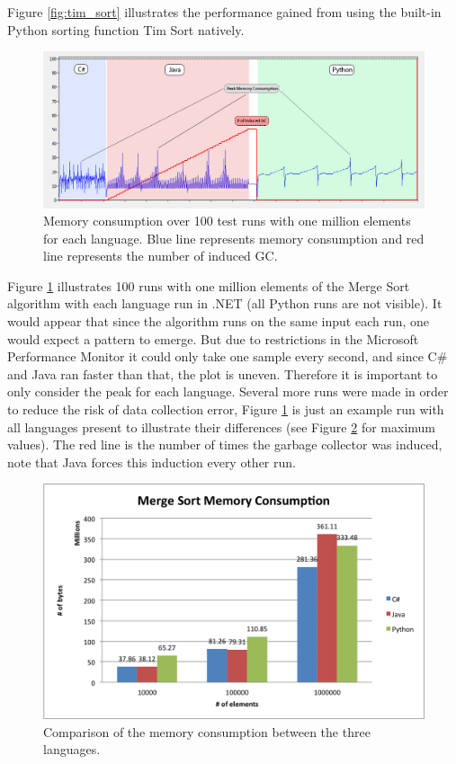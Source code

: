Figure \ref{fig:tim_sort} illustrates the performance gained from using the built-in Python sorting function Tim Sort natively. 



\begin{figure}[h]
	\centering
	\includegraphics[width=1.0\textwidth]{chapters/media/mergesort_memory_1mil_all.png}
	\caption{Memory consumption over 100 test runs with one million elements for each language. Blue line represents memory consumption and red line represents the number of induced GC.}
	\label{fig:merge_sort_memory_all}
\end{figure}


Figure \ref{fig:merge_sort_memory_all} illustrates 100 runs with one million elements of the Merge Sort algorithm with each language run in .NET (all Python runs are not visible). It would appear that since the algorithm runs on the same input each run, one would expect a pattern to emerge. But due to restrictions in the Microsoft Performance Monitor it could only take one sample every second, and since C\# and Java ran faster than that, the plot is uneven. Therefore it is important to only consider the peak for each language. Several more runs were made in order to reduce the risk of data collection error, Figure \ref{fig:merge_sort_memory_all} is just an example run with all languages present to illustrate their differences (see Figure \ref{fig:merge_sort_memory} for  maximum values). The red line is the number of times the garbage collector was induced, note that Java forces this induction every other run.


\begin{figure}[h]
	\centering
	\includegraphics[width=1.0\textwidth]{chapters/media/merge_sort_memory.png}
	\caption{Comparison of the memory consumption between the three languages.}
	\label{fig:merge_sort_memory}
\end{figure}

